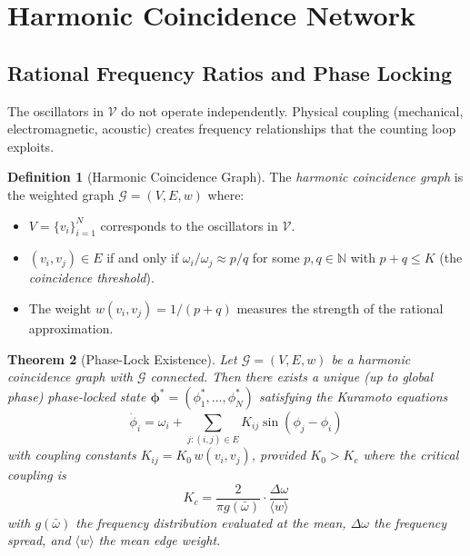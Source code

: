 \documentclass[twocolumn,10pt]{article}
\newtheorem{theorem}{Theorem}[section]
\theoremstyle{definition}
\newtheorem{definition}[theorem]{Definition}
\theoremstyle{remark}
\newcommand{\N}{\mathbb{N}}
\newcommand{\Gcal}{\mathcal{G}}
\begin{document}
\section{Harmonic Coincidence Network}\label{sec:harmonic-coincidence}

\subsection{Rational Frequency Ratios and Phase Locking}

The oscillators in $\mathcal{V}$ do not operate independently. Physical
coupling (mechanical, electromagnetic, acoustic) creates frequency
relationships that the counting loop exploits.

\begin{definition}[Harmonic Coincidence Graph]\label{def:harmonic-graph}
The \emph{harmonic coincidence graph} is the weighted graph
$\Gcal = (V, E, w)$ where:
\begin{itemize}
  \item $V = \{v_i\}_{i=1}^N$ corresponds to the oscillators in
    $\mathcal{V}$.
  \item $(v_i, v_j) \in E$ if and only if $\omega_i / \omega_j \approx
    p/q$ for some $p, q \in \N$ with $p + q \leq K$ (the
    \emph{coincidence threshold}).
  \item The weight $w(v_i, v_j) = 1/(p + q)$ measures the strength of the
    rational approximation.
\end{itemize}
\end{definition}



\begin{theorem}[Phase-Lock Existence]\label{thm:phase-lock}
Let $\Gcal = (V, E, w)$ be a harmonic coincidence graph with $\Gcal$
connected. Then there exists a unique (up to global phase) phase-locked
state $\bm{\phi}^* = (\phi_1^*, \ldots, \phi_N^*)$ satisfying the
Kuramoto equations~\cite{kuramoto1984}
\begin{equation}\label{eq:kuramoto}
  \dot{\phi}_i = \omega_i + \sum_{j: (i,j) \in E} K_{ij}
  \sin(\phi_j - \phi_i)
\end{equation}
with coupling constants $K_{ij} = K_0 \, w(v_i, v_j)$, provided
$K_0 > K_c$ where the critical coupling is
\begin{equation}\label{eq:critical-coupling}
  K_c = \frac{2}{\pi g(\bar{\omega})} \cdot
  \frac{\Delta \omega}{\langle w \rangle}
\end{equation}
with $g(\bar{\omega})$ the frequency distribution evaluated at the mean,
$\Delta \omega$ the frequency spread, and $\langle w \rangle$ the mean
edge weight.
\end{theorem}
\end{document}
